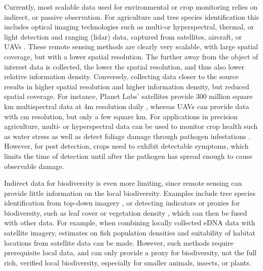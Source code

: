 Currently, most scalable data used for environmental or crop monitoring relies on indirect, or passive observation. For agriculture and tree species identification this includes optical imaging technologies such as multi-or hyperspectral, thermal, or light detection and ranging (lidar) data, captured from satellites, aircraft, or UAVs \cite{Tsouros2019, Toth2016, Singh2020, Mahlein2018}. 
These remote sensing methods are clearly very scalable, with large spatial coverage, but with a lower spatial resolution. The further away from the object of interest data is collected, the lower the spatial resolution, and thus also lower relative information density. 
Conversely, collecting data closer to the source results in higher spatial resolution and higher information density, but reduced spatial coverage. For instance, Planet Labs' satellites provide 300 million square km multispectral data at 4m resolution daily \cite{Lab}, whereas UAVs can provide data with cm resolution, but only a few square km.
For applications in precision agriculture, multi- or hyperspectral data can be used to monitor crop health such as water stress as well as detect foliage damage through pathogen infestations \cite{Mahlein2018}. However, for pest detection, crops need to exhibit detectable symptoms, which limits the time of detection until after the pathogen has spread enough to cause observable damage. 
 
Indirect data for biodiversity is even more limiting, since remote sensing can provide little information on the local biodiversity. Examples include tree species identification from top-down imagery \cite{Onishi2021, Schiefer2020, Xu2020a}, or detecting indicators or proxies for biodiversity, such as leaf cover or vegetation density \cite{Skidmore2015}, which can then be fused with other data. For example, when combining locally collected eDNA data with satellite imagery, estimates on fish population densities and suitability of habitat locations from satellite data can be made\cite{Zong2024}. However, such methods require prerequisite local data, and can only provide a proxy for biodiversity, not the full rich, verified local biodiversity, especially for smaller animals, insects, or plants.


